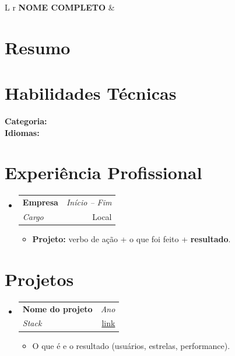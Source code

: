 \documentclass[a4paper,11pt]{article}
\makeatletter
\newcommand{\resumeSubheading}[4]{
\vspace{0.5mm}\item
    \begin{tabular*}{0.98\textwidth}[t]{l@{\extracolsep{\fill}}r}
        \textbf{#1} & \textit{\footnotesize{#4}} \\
        \textit{\footnotesize{#3}} &  \footnotesize{#2}\\
    \end{tabular*}
    \vspace{-2.4mm}
}
\newcommand{\resumeSubHeadingListStart}{\begin{itemize}[leftmargin=*,labelsep=0mm]}
\newcommand{\resumeItemListStart}{\begin{justify}\begin{itemize}[leftmargin=3ex, rightmargin=2ex, noitemsep,labelsep=1.2mm,itemsep=0mm]\small}
\newcommand{\resumeSubHeadingListEnd}{\end{itemize}\vspace{2mm}}
\newcommand{\resumeItemListEnd}{\end{itemize}\end{justify}\vspace{-2mm}}
\makeatother
\begin{document}
\selectfont

\begin{tabularx}{\linewidth}{L r}
\textbf{\Large NOME COMPLETO} & \\
\end{tabularx}

\section{\textbf{Resumo}}
\small{
}

\section{\textbf{Habilidades Técnicas}}
\small{
\textbf{Categoria:} \\
\textbf{Idiomas:}
}

\section{\textbf{Experiência Profissional}}
\resumeSubHeadingListStart
\resumeSubheading
{ Empresa}{Local}
{Cargo}{Início -- Fim}
\resumeItemListStart
\item{\textbf{Projeto:} verbo de ação + o que foi feito + \textbf{resultado}.}
\resumeItemListEnd
\resumeSubHeadingListEnd

\section{\textbf{Projetos}}
\resumeSubHeadingListStart
\resumeSubheading
{ Nome do projeto}{\href{https://LINK}{link}}
{Stack}{Ano}
\resumeItemListStart
\item{O que é e o resultado (usuários, estrelas, performance).}
\resumeItemListEnd
\resumeSubHeadingListEnd
\end{document}
